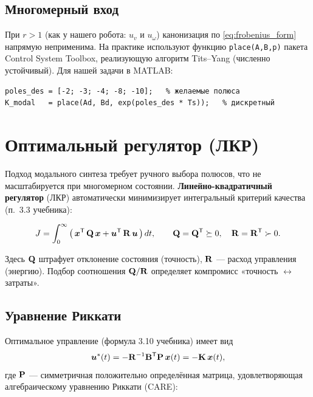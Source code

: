 \subsection{Многомерный вход}

При $r > 1$ (как у нашего робота: $u_v$ и $u_\omega$) канонизация по
\eqref{eq:frobenius_form} напрямую неприменима. На практике используют
функцию \texttt{place(A,B,p)} пакета Control System Toolbox, реализующую
алгоритм Tits--Yang (численно устойчивый). Для нашей задачи в MATLAB:
\begin{filebox}[title={\filepath{matlab/design\_modal.m}}]
\begin{lstlisting}[style=matlabstyle]
poles_des = [-2; -3; -4; -8; -10];   % желаемые полюса
K_modal   = place(Ad, Bd, exp(poles_des * Ts));   % дискретный
\end{lstlisting}
\end{filebox}

\section{Оптимальный регулятор (ЛКР)}
\label{sec:lqr}

Подход модального синтеза требует ручного выбора полюсов, что
не масштабируется при многомерном состоянии. \textbf{Линейно-квадратичный
регулятор} (ЛКР) автоматически минимизирует интегральный критерий качества
(п.~3.3 учебника):

\begin{formulabox}[title={Критерий качества}]
\begin{equation}
  J = \int_0^\infty \big(\,\bm{x}^{\mathsf{T}}\,\mathbf{Q}\,\bm{x} + \bm{u}^{\mathsf{T}}\,\mathbf{R}\,\bm{u}\,\big)\,dt,
  \qquad \mathbf{Q} = \mathbf{Q}^{\mathsf{T}} \succeq 0, \quad \mathbf{R} = \mathbf{R}^{\mathsf{T}} \succ 0.
  \label{eq:lqr_cost}
\end{equation}
\end{formulabox}

Здесь $\mathbf{Q}$ штрафует отклонение состояния (точность),
$\mathbf{R}$ --- расход управления (энергию). Подбор соотношения $\mathbf{Q}/\mathbf{R}$
определяет компромисс «точность $\leftrightarrow$ затраты».

\subsection{Уравнение Риккати}

Оптимальное управление (формула 3.10 учебника) имеет вид
\begin{equation}
  \bm{u}^*(t) = -\mathbf{R}^{-1}\mathbf{B}^{\mathsf{T}}\mathbf{P}\,\bm{x}(t) = -\mathbf{K}\,\bm{x}(t),
  \label{eq:lqr_optimal}
\end{equation}
где $\mathbf{P}$ --- симметричная положительно определённая матрица,
удовлетворяющая алгебраическому уравнению Риккати (CARE):

